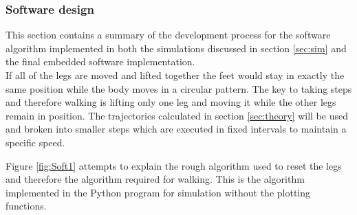 \subsubsection{Software design}
\label{sec:soft}
This section contains a summary of the development process for the software algorithm implemented in both the simulations discussed in section \ref{sec:sim} and the final embedded software implementation.\\

If all of the legs are moved and lifted together the feet would stay in exactly the same position while the body moves in a circular pattern. The key to taking steps and therefore walking is lifting only one leg and moving it while the other legs remain in position. The trajectories calculated in section \ref{sec:theory} will be used and broken into smaller steps which are executed in fixed intervals to maintain a specific speed. 

Figure \ref{fig:Soft1} attempts to explain the rough algorithm used to reset the legs and therefore the algorithm required for walking. This is the algorithm implemented in the Python program for simulation without the plotting functions.

